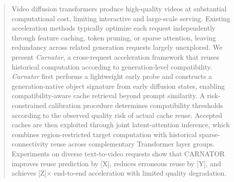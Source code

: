 \begin{abstract}
Video diffusion transformers produce high-quality videos at substantial computational cost, limiting interactive and large-scale serving.
Existing acceleration methods typically optimize each request independently through feature caching, token pruning, or sparse attention, leaving redundancy across related generation requests largely unexplored.
We present \emph{Carnator}, a cross-request acceleration framework that reuses historical computation according to generation-level compatibility.
\emph{Carnator} first performs a lightweight early probe and constructs a generation-native object signature from early diffusion states, enabling compatibility-aware cache retrieval beyond prompt similarity.
A risk-constrained calibration procedure determines compatibility thresholds according to the observed quality risk of actual cache reuse.
Accepted caches are then exploited through joint latent-attention inference, which combines region-restricted target computation with historical sparse-connectivity reuse across complementary Transformer layer groups.
Experiments on diverse text-to-video requests show that CARNATOR improves reuse prediction by [X], reduces erroneous reuse by [Y], and achieves [Z]$\times$ end-to-end acceleration with limited quality degradation.
\end{abstract}

